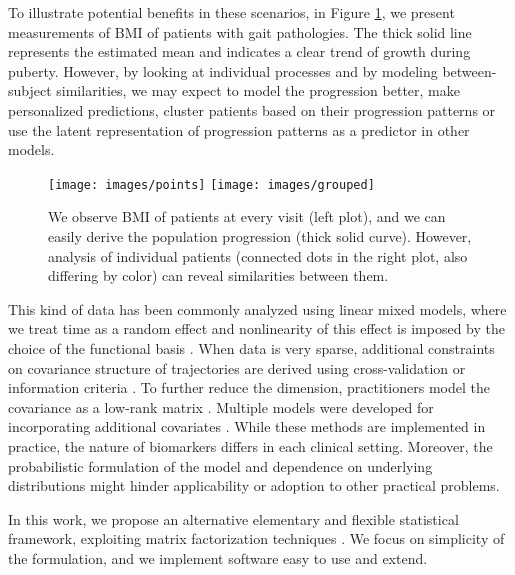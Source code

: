 \documentclass[preprint]{imsart}
\numberwithin{equation}{section}
\theoremstyle{plain}
\begin{document}

To illustrate potential benefits in these scenarios, in Figure \ref{fig:motivation}, we present measurements of BMI of patients with gait pathologies. The thick solid line represents the estimated mean and indicates a clear trend of growth during puberty. However, by looking at individual processes and by modeling between-subject similarities, we may expect to model the progression better, make personalized predictions, cluster patients based on their progression patterns or use the latent representation of progression patterns as a predictor in other models. 

\begin{figure}[h]
  \texttt{[image: images/points]}
  \texttt{[image: images/grouped]}
  \caption{We observe BMI of patients at every visit (left plot), and we can easily derive the population progression (thick solid curve). However, analysis of individual patients (connected dots in the right plot, also differing by color) can reveal similarities between them.}
  \label{fig:motivation}
\end{figure}

This kind of data has been commonly analyzed using linear mixed models, where we treat time as a random effect and nonlinearity of this effect is imposed by the choice of the functional basis \citep{zeger1988models, verbeke1997linear, mcculloch2001generalized}. When data is very sparse, additional constraints on covariance structure of trajectories are derived using cross-validation or information criteria \citep{rice2001nonparametric,bigelow2009bayesian}. To further reduce the dimension, practitioners model the covariance as a low-rank matrix \citep{james2000principal,berkey1983longitudinal, yan2017dynamic, hall2006properties, besse1986principal, yao2006penalized, greven2011longitudinal}. Multiple models were developed for incorporating additional covariates \citep{song2002semiparametric, liu2009joint, rizopoulos2014combining}. While these methods are implemented in practice, the nature of biomarkers differs in each clinical setting. Moreover, the probabilistic formulation of the model and dependence on underlying distributions might hinder applicability or adoption to other practical problems.

In this work, we propose an alternative elementary and flexible statistical framework, exploiting matrix factorization techniques \citep{mazumder2010spectral, hastie2015matrix, fazel2002matrix, cai2010singular}. We focus on simplicity of the formulation, and we implement software easy to use and extend. 
\end{document}
